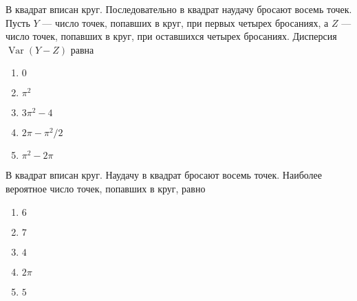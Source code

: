 \documentclass[t]{beamer}
\DeclareMathOperator{\Var}{Var}
\begin{document}
 \begin{frame} \label{11} 
\begin{block}{11} 

В квадрат вписан круг. Последовательно в квадрат наудачу бросают восемь точек. Пусть $Y$ — число точек, попавших в круг, при первых четырех бросаниях, а $Z$ — число точек, попавших в круг, при оставшихся четырех бросаниях. Дисперсия $\Var(Y - Z)$ равна
 


 \end{block} 
\begin{enumerate} 
\item[] \hyperlink{11-No}{\beamergotobutton{}  $0$
}
\item[] \hyperlink{11-No}{\beamergotobutton{} $\pi^2$}
\item[] \hyperlink{11-No}{\beamergotobutton{} $3\pi^2 - 4$}
\item[] \hyperlink{11-Yes}{\beamergotobutton{} $2\pi - \pi^2 / 2$}
\item[] \hyperlink{11-No}{\beamergotobutton{} $\pi^2 - 2 \pi$}
\end{enumerate} 
\end{frame} 


 \begin{frame} \label{12} 
\begin{block}{12} 

В квадрат вписан круг. Наудачу в квадрат бросают восемь точек. Наиболее вероятное число точек, попавших в круг, равно
 


 \end{block} 
\begin{enumerate} 
\item[] \hyperlink{12-No}{\beamergotobutton{} $6$
}
\item[] \hyperlink{12-Yes}{\beamergotobutton{} $7$}
\item[] \hyperlink{12-No}{\beamergotobutton{} $4$}
\item[] \hyperlink{12-No}{\beamergotobutton{} $2\pi$}
\item[] \hyperlink{12-No}{\beamergotobutton{} $5$}
\end{enumerate} 
\end{frame} 
\end{document}
